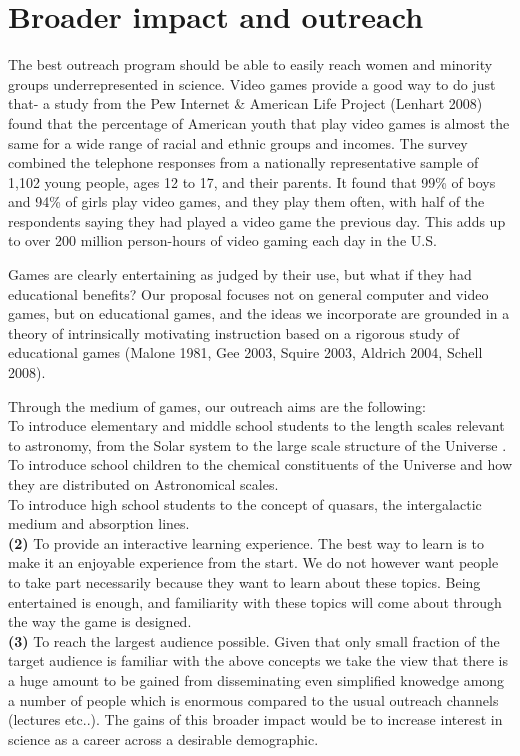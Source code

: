 \section{Broader impact and outreach}

The best outreach program should be able to easily reach women and
minority groups underrepresented in science. Video games provide
a good way to do just that- a  study from the  Pew Internet 
\& American Life 
Project (Lenhart 2008) found that the percentage of American youth
that play video games is almost the same for a wide range of racial and
ethnic groups and incomes. The survey combined the telephone responses 
from a nationally representative sample of 1,102 young people, ages 12 to 
17, and their parents. It found that 99\% of boys and 94\% of girls
play video games, and they play them often, with  half of the respondents 
saying they had played a video game the previous day. This adds up to
over 200 million person-hours of video gaming each day in the U.S.

Games are clearly entertaining as judged by their use, 
but what if they had educational benefits? 
Our proposal 
focuses not on general computer and video games, but on educational games,
and the ideas we incorporate are 
grounded in a theory of intrinsically motivating instruction 
based on a rigorous study of educational games 
(Malone 1981, Gee 2003,
Squire 2003, Aldrich 2004, Schell 2008).


Through the medium of  games, our outreach aims are the following:\\
 To introduce  elementary and middle
school students to the length scales relevant
to astronomy, from the Solar system to the large scale structure of the Universe
.\\
  To introduce school children to the chemical constituents
 of the Universe and how they are distributed on Astronomical scales.\\
 To introduce high school students to the concept
of quasars, the  intergalactic medium and absorption lines.\\
{\bf (2)} To provide an interactive 
learning experience. The best way to learn is
to make it an enjoyable  experience from the start. We do not
however want people to take part necessarily
because they want to learn about these
topics. Being entertained is enough, and familiarity with these topics
will come about through the way the game is designed.\\
{\bf (3)}
To reach the largest audience possible. Given that only small fraction of 
the target audience is familiar with  the above concepts  we take the view 
that 
there is a huge amount to be gained from disseminating even simplified 
knowedge among a number of people which is enormous compared to the usual 
outreach channels (lectures  etc..). The gains of this broader 
impact would be to increase interest in science as a career across 
a desirable demographic.
  

